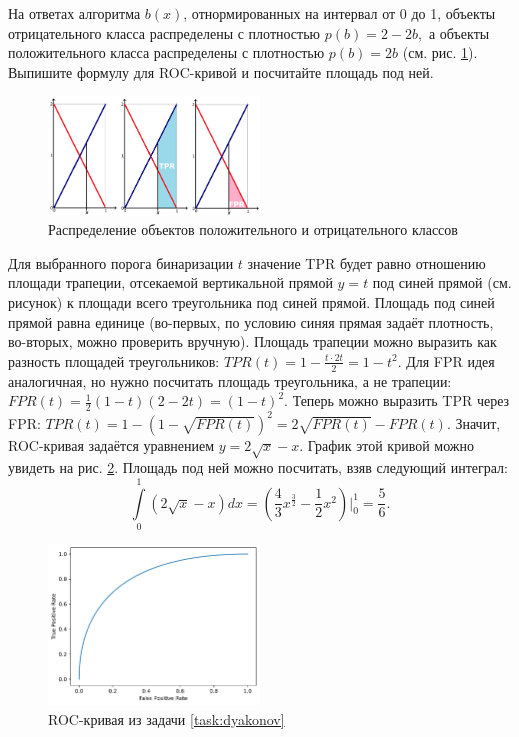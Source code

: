 \documentclass[12pt,a4paper]{article}
\begin{document}
\begin{vkProblem}\label{task:dyakonov}
На ответах алгоритма $b(x)$, отнормированных на интервал от 0 до 1, объекты отрицательного класса распределены с плотностью $p(b) = 2 - 2b,$ а объекты положительного класса распределены с плотностью $p(b) = 2b$ (см. рис. \ref{fig:densities}).
Выпишите формулу для ROC-кривой и посчитайте площадь под ней.
\end{vkProblem}

\begin{figure}[th!]
	\centering
	\includegraphics[width=0.5\textwidth]{./img/pic6.png}
	\caption{Распределение объектов положительного и отрицательного классов}
 \label{fig:densities}
\end{figure}

\begin{esSolution}
Для выбранного порога бинаризации $t$ значение TPR будет равно отношению площади трапеции, отсекаемой вертикальной прямой $y = t$ под синей прямой (см. рисунок) к площади всего треугольника под синей прямой.
Площадь под синей прямой равна единице (во-первых, по условию синяя прямая задаёт плотность, во-вторых, можно проверить вручную).
Площадь трапеции можно выразить как разность площадей треугольников: $TPR(t) = 1 - \frac{t \cdot 2t}{2} = 1 - t^2.$
Для FPR идея аналогичная, но нужно посчитать площадь треугольника, а не трапеции: $FPR(t) = \frac{1}{2}(1 - t)(2 - 2t) = (1 - t)^2.$
Теперь можно выразить TPR через FPR:
$TPR(t) = 1 - (1 - \sqrt{FPR(t)})^2 = 2\sqrt{FPR(t)} - FPR(t).$
Значит, ROC-кривая задаётся уравнением $y = 2\sqrt{x} - x.$
График этой кривой можно увидеть на рис. \ref{fig:roc2}.
Площадь под ней можно посчитать, взяв следующий интеграл:
$$
\int\limits_0^1 (2\sqrt{x} - x)dx = \left(\frac{4}{3}x^{\frac{3}{2}} - \frac{1}{2}x^2\right)\bigg|_0^1 = \frac{5}{6}.
$$

\begin{figure}[th!]
	\centering
	\includegraphics[width=0.5\textwidth]{./img/roc2.pdf}
	\caption{ROC-кривая из задачи \ref{task:dyakonov}}
 \label{fig:roc2}
\end{figure}

\end{esSolution}
\end{document}
